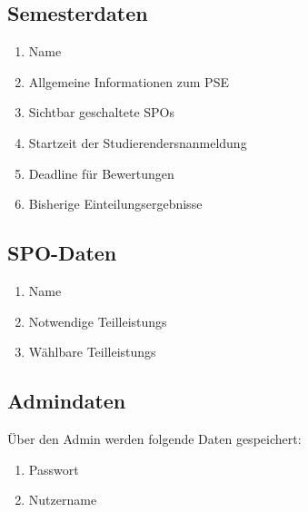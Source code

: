 \documentclass[parskip=full]{scrartcl}
\newcommand{\swtLabel}[1]{\textbf{/#1\arabic*0/}}
\begin{document}
\subsection{Semesterdaten}
\begin{enumerate}[label=\swtLabel{D}, resume]
    \item Name
    \item Allgemeine Informationen zum \gls{PSE}
    \item Sichtbar geschaltete \glspl{SPO}
    \item Startzeit der \glspl{Studierender}nanmeldung
    \item Deadline für \gls{Bewertung}en
    \item Bisherige \gls{Einteilung}sergebnisse
\end{enumerate}

\subsection{\gls{SPO}-Daten}
\begin{enumerate}[label=\swtLabel{D}, resume]
	\item Name
	\item Notwendige \glspl{Teilleistung}
	\item Wählbare \glspl{Teilleistung}
\end{enumerate}


\subsection{\gls{Admin}daten}
Über den \gls{Admin} werden folgende Daten gespeichert:
\begin{enumerate}[label=\swtLabel{D}, resume] 
	\item Passwort
	\item Nutzername
\end{enumerate}
\end{document}
